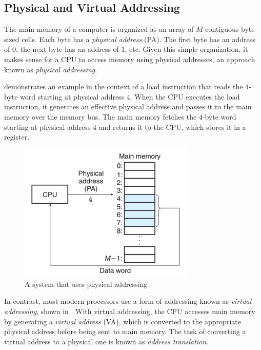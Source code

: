 \documentclass[../ch1.tex, ../../main.tex]{subfiles}
\begin{document}
    \subsection{Physical and Virtual Addressing}

        The main memory of a computer is organized as an array of $M$ contiguous byte-sized cells. Each byte has a \textit{physical address} (PA). The first byte has an address of $0$, the next byte has an address of $1$, etc. Given this simple organization, it makes sense for a CPU to access memory using physical addresses, an approach known as \textit{physical addressing}.

         demonstrates an example in the context of a load instruction that reads the $4$-byte word starting at physical address $4$. When the CPU executes the load instruction, it generates an effective physical address and passes it to the main memory over the memory bus. The main memory fetches the $4$-byte word starting at physical address $4$ and returns it to the CPU, which stores it in a register.

        \begin{figure}[H]
            \centering
            \includegraphics[width=0.75\textwidth]{graphics/Figure 4.1.png}
            \caption{A system that uses physical addressing}
            \label{fig:41}
        \end{figure}

        In contrast, most modern processors use a form of addressing known as \textit{virtual addressing}, shown in . With virtual addressing, the CPU accesses main memory by generating a \textit{virtual address} (VA), which is converted to the appropriate physical address before being sent to main memory. The task of converting a virtual address to a physical one is known as \textit{address translation}.
\end{document}
